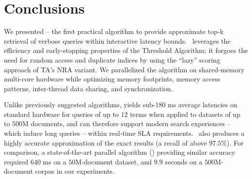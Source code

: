 \section{Conclusions}
\label{sec:conclusions}

We presented \alg\/ -- the first practical algorithm to provide 
approximate top-k retrieval of verbose queries within interactive latency bounds.
\alg\ leverages the efficiency and early-stopping properties of the Threshold Algorithm; it forgoes the need for random access
and duplicate indices by using the ``lazy'' scoring approach of TA's NRA variant. We
parallelized the algorithm on shared-memory multi-core hardware while 
optimizing memory footprints, memory access 
patterns, inter-thread data sharing, and synchronization.  

Unlike previously suggested algorithms, \alg\/ yields sub-$180$ ms average latencies on standard hardware
for queries of up to $12$ terms when applied to datasets of up to $500$M documents, and 
can therefore support modern search experiences -- which induce long queries --
within real-time SLA requirements.  
\alg\ also produces a highly accurate approximation of the exact results (a recall of above 
$97.5\%$). %
For comparison, 
a state-of-the-art parallel algorithm (\pBMW) providing similar accuracy required $640$ ms on a $50$M-document dataset, 
and  $9.9$ seconds on a $500$M-document corpus in our experiments. 


